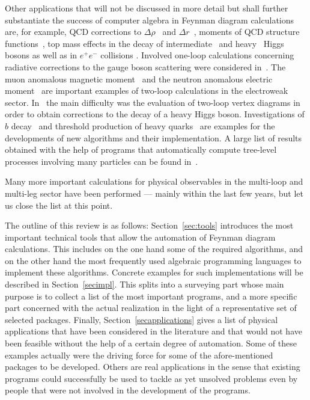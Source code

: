 Other applications that will not be discussed in more detail but shall
further substantiate the success of computer algebra in Feynman diagram
calculations are, for example, QCD corrections to
$\Delta\rho$~\cite{Avd95,CheKueSte951} and $\Delta
r$~\cite{CheKueSte952}, moments of QCD structure
functions~\cite{LarTkaVer91,LarRitVer94,LarNogRitVer96}, top mass
effects in the decay of intermediate~\cite{LarRitVer95CheKwi96} and
heavy~\cite{HarSte97} Higgs bosons as well as in $e^+e^-$ collisions
\cite{HarSte98}.  Involved one-loop calculations concerning radiative
corrections to the gauge boson scattering were considered
in~\cite{DenDitHah97}.  The muon anomalous magnetic
moment~\cite{CzaKraMar96} and the neutron anomalous electric
moment~\cite{CzaKra97} are important examples of two-loop calculations
in the electroweak sector.  In~\cite{FriKniKreRie96} the main difficulty
was the evaluation of two-loop vertex diagrams in order to obtain
corrections to the decay of a heavy Higgs boson.  Investigations of $b$
decay~\cite{CzaMel97,CzaMel98b} and threshold production of heavy
quarks~\cite{CzaMel98,BenSmi98,HoaTeu98,BenSigSmi98} are examples for
the developments of new algorithms and their implementation.  A large
list of results obtained with the help of programs that automatically
compute tree-level processes involving many particles can be found
in~\cite{comphep}.

Many more important calculations for physical observables in the
multi-loop and multi-leg sector have been performed --- mainly within
the last few years, but let us close the list at this point.

The outline of this review is as follows: Section~\ref{sec:tools}
introduces the most important technical tools that allow the automation
of Feynman diagram calculations. This includes on the one hand some of
the required algorithms, and on the other hand the most frequently used
algebraic programming languages to implement these algorithms.  Concrete
examples for such implementations will be described in
Section~\ref{secimpl}. This splits into a surveying part whose main
purpose is to collect a list of the most important programs, and a more
specific part concerned with the actual realization in the light of a
representative set of selected packages.  Finally,
Section~\ref{secapplications} gives a list of physical applications that
have been considered in the literature and that would not have been
feasible without the help of a certain degree of automation. Some of
these examples actually were the driving force for some of the
afore-mentioned packages to be developed. Others are real applications
in the sense that existing programs could successfully be used to tackle
as yet unsolved problems even by people that were not involved in the
development of the programs.

%
%
